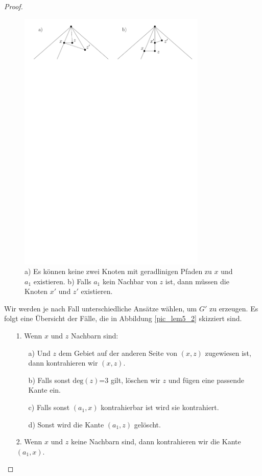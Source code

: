 \begin{proof}
\begin{figure}[h]
	\centering
	  \includegraphics[width=0.8\textwidth]{lem5_1.pdf}
    	\caption{a) Es können keine zwei Knoten mit geradlinigen Pfaden zu $x$ und $a_1$ existieren. b) Falls $a_1$ kein Nachbar von $z$ ist, dann müssen die Knoten $x'$ und $z'$ existieren.}
    	\label{pic_lem5_1}
\end{figure}

Wir werden je nach Fall unterschiedliche Ansätze wählen, um $G'$ zu erzeugen. Es folgt eine Übersicht der Fälle, die in Abbildung \ref{pic_lem5_2} skizziert sind.

\begin{itemize}
\item [1.] Wenn $x$ und $z$ Nachbarn sind:
	\begin{itemize}
	\item [a)] Und $z$ dem Gebiet auf der anderen Seite von $(x,z)$ zugewiesen ist, dann kontrahieren wir $(x,z)$.
	\item [b)] Falls sonst $\text{deg}(z)$=3 gilt, löschen wir $z$ und fügen eine passende Kante ein.
	\item [c)] Falls sonst $(a_1,x)$ kontrahierbar ist wird sie kontrahiert.
	\item [d)] Sonst wird die Kante $(a_1,z)$ gelöscht.
	\end{itemize}
\item [2.] Wenn $x$ und $z$ keine Nachbarn sind, dann kontrahieren wir die Kante $(a_1,x)$.
\end{itemize} 


\end{proof}
